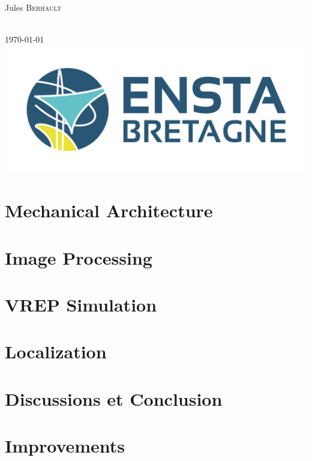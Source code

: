 \documentclass[12pt]{article}
\begin{document}
\begin{titlepage}
\begin{minipage}{0.4\textwidth}
        \begin{flushleft} \large
            Jules \textsc{Berhault}\\  %
            \end{flushleft}
\end{minipage}\\[1cm]
{\large \today}\\[1cm] %
\includegraphics{ENSTA1246-524.png}%
\vfill %

\end{titlepage}

\tableofcontents          %
\listoffigures
\listoftables
\newpage












\section{Mechanical Architecture}


\section{Image Processing}


\section{VREP Simulation}


\section{Localization}




\section{Discussions et Conclusion}


\section{Improvements}




\end{document}
